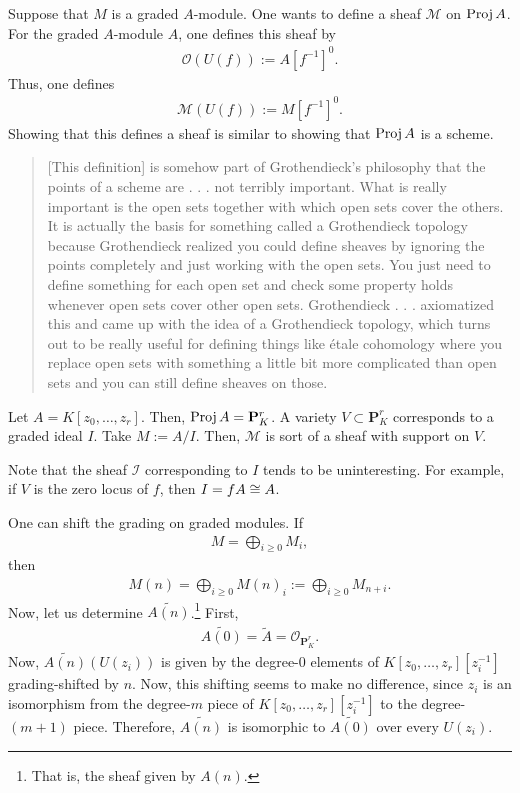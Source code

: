 \documentclass [11 pt, oneside] {article}
\begin{document}
Suppose that $M$ is a graded $A$-module. One wants to define a sheaf $\mathscr{M}$ on $\operatorname{Proj} A$. For the graded $A$-module $A$, one defines this sheaf by
\begin{align*}
	\mathscr{O}(U(f)) := A[f^{-1}]^0.
\end{align*}
Thus, one defines
\begin{align*}
	\mathscr{M}(U(f)) := M[f^{-1}]^0.
\end{align*}
Showing that this defines a sheaf is similar to showing that $\operatorname{Proj} A$ is a scheme.
\begin{quote}
	\small [This definition] is somehow part of Grothendieck's philosophy that the points of a scheme are . . . not terribly important. What is really important is the open sets together with which open sets cover the others. It is actually the basis for something called a Grothendieck topology because Grothendieck realized you could define sheaves by ignoring the points completely and just working with the open sets. You just need to define something for each open set and check some property holds whenever open sets cover other open sets. Grothendieck . . . axiomatized this and came up with the idea of a Grothendieck topology, which turns out to be really useful for defining things like \'etale cohomology where you replace open sets with something a little bit more complicated than open sets and you can still define sheaves on those.
\end{quote}

\begin{example}[ ]\label{}\text{}
Let $A = K[z_0,\hdots,z_r]$. Then, $\operatorname{Proj} A = \mathbf{P}^r_K$. A variety $V\subset \mathbf{P}^r_K$ corresponds to a graded ideal $I$. Take $M:=A/I$. Then, $\mathscr{M}$ is sort of a sheaf with support on $V$.

Note that the sheaf $\mathscr{I}$ corresponding to $I$ tends to be uninteresting. For example, if $V$ is the zero locus of $f$, then $I=fA\cong A$.
\end{example}

One can shift the grading on graded modules. If 
\begin{align*}
	M = \bigoplus_{i\ge 0}M_i,
\end{align*}
then
\begin{align*}
	M(n) = \bigoplus_{i\ge 0}M (n)_i :=  \bigoplus_{i\ge 0} M_{n+i}.
\end{align*}
Now, let us determine $\widetilde{A(n)}$.\footnote{That is, the sheaf given by $A(n)$.} First,
\begin{align*}
	\widetilde{A(0) } = \tilde A = \mathscr{O}_{\mathbf{P}^r_K}.
\end{align*}
Now, $\widetilde {A(n)} (U(z_i))$ is given by the degree-$0$ elements of $K[z_0,\hdots,z_r][z_i^{-1}]$ grading-shifted by $n$. Now, this shifting seems to make no difference, since $z_i$ is an isomorphism from the degree-$m$ piece of $K[z_0,\hdots,z_r][z_i^{-1}]$ to the degree-$(m+1) $ piece. Therefore, $\widetilde{A(n)}$ is isomorphic to $\widetilde{A(0)}$ over every $U(z_i)$.
\end{document}
